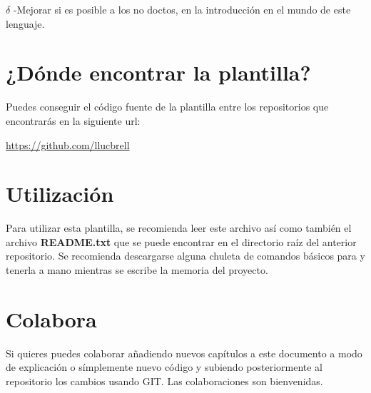 \textbf{$\delta$} -Mejorar si es posible a los no doctos, en la introducción en el mundo de este lenguaje.

\section*{¿Dónde encontrar la plantilla?}
Puedes conseguir el código fuente de la plantilla entre los repositorios que encontrarás en la siguiente url:

\begin{center}\url{https://github.com/llucbrell}\end{center}

\section*{Utilización}
Para utilizar esta plantilla, se recomienda leer este archivo así como también el archivo \textbf{README.txt} que se puede encontrar en el directorio raíz del anterior repositorio. Se recomienda descargarse alguna chuleta de comandos básicos para  y tenerla a mano mientras se escribe la memoria del proyecto. 

\section*{Colabora}
Si quieres puedes colaborar añadiendo nuevos capítulos a este documento a modo de explicación o símplemente nuevo código y subiendo posteriormente al repositorio los cambios usando  GIT. Las colaboraciones son bienvenidas. 
